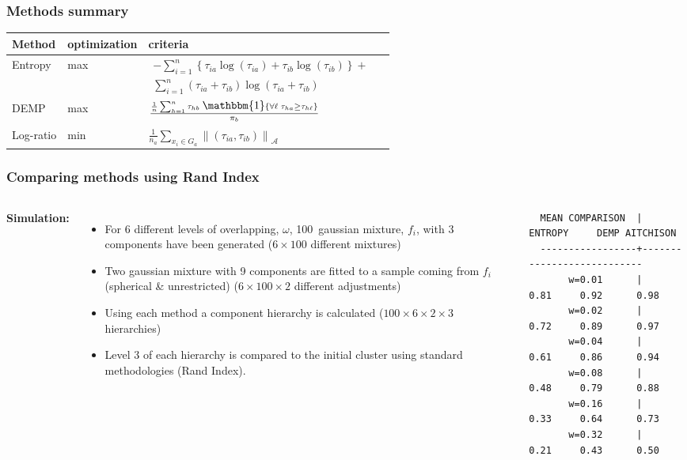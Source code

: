 \begin{frame}
\frametitle{Methods summary}
\small
\begin{tabular}{ >{\centering}m{0.7in} | >{\centering}m{0.8in} | >{\centering}m{1.3in} m{0in}}
\textbf{Method} & \textbf{optimization} & \textbf{criteria} & \\\hline\hline
Entropy     & max  & 
$\substack{- \sum_{i=1}^n \left\{ \tau_{i a} \log(\tau_{i a}) + \tau_{i b} \log(\tau_{i b})\right\} + \\
\sum_{i=1}^n  (\tau_{i a}+\tau_{i b}) \log(\tau_{i a} + \tau_{i b})}$  & \\ [2em]
\hline
DEMP        & max & $\frac{ \frac{1}{n} \sum_{h=1}^n \tau_{hb} \; \mathlarger{\mathbbm{1}}\left\{ \forall \ell \; \tau_{ha} \geq \tau_{h\ell}  \right\}  }{ \pi_b }$ &\\ [2em]
\hline
Log-ratio   & min & $\frac{1}{n_a} \sum_{x_i \in G_a} \left\| (\tau_{ia}, \tau_{ib}) \right\|_{\mathcal{A}}$ & \\ [2em]
\end{tabular}

\end{frame}

\begin{frame}[fragile]
\frametitle{Comparing methods using Rand Index}
\centering
\begin{columns}[T]

\scriptsize

\textbf{Simulation:}

\begin{itemize}
\item For $6$ different levels of overlapping, $\omega$, 100~gaussian mixture, $f_i$,  with $3$ components have been generated ($6 \times 100$ different mixtures)
\item Two gaussian mixture with 9 components are fitted to a sample coming from $f_i$ (spherical \& unrestricted) ($6 \times 100 \times 2$ different adjustments)
\item Using each method a component hierarchy is calculated ($100 \times 6 \times 2 \times 3$  hierarchies)
\item Level $3$ of each hierarchy is compared to the initial cluster using standard methodologies (Rand Index).
\end{itemize}
\begin{center}
\pause

\begin{verbatim}
  MEAN COMPARISON  | ENTROPY     DEMP AITCHISON
  -----------------+---------------------------
       w=0.01      |    0.81     0.92      0.98
       w=0.02      |    0.72     0.89      0.97
       w=0.04      |    0.61     0.86      0.94
       w=0.08      |    0.48     0.79      0.88
       w=0.16      |    0.33     0.64      0.73
       w=0.32      |    0.21     0.43      0.50
\end{verbatim}
\end{center}
\end{columns}

\end{frame}
